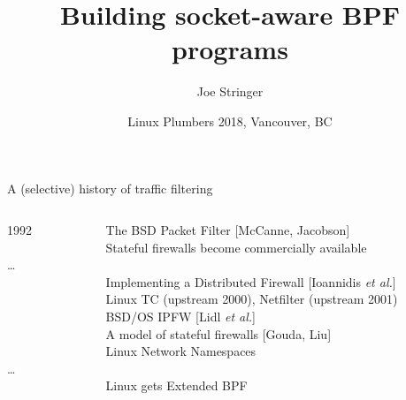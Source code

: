 \documentclass[black,white]{beamer}
\title[BPF Socket Lookup]{Building socket-aware BPF programs}
\institute{Cilium.io}
\author[Joe Stringer]{Joe Stringer}
\date[Nov 13, 2018]{Linux Plumbers 2018, Vancouver, BC}
\begin{document}
    \begin{frame}
    \titlepage
    \end{frame}

    \begin{frame}{A (selective) history of traffic filtering}
        \begin{columns}[c]
            \begin{column}{0.15\textwidth}
                1992\\ \\ \smallskip
                \ldots\\ \\ \smallskip
                ~\\ \\ \\ \\ \smallskip
                \ldots\\ \\ \smallskip
            \end{column}
            \hspace{-50pt}
            \vrule{}
            \begin{column}{0.85\textwidth}
                The BSD Packet Filter [McCanne, Jacobson]\\ \smallskip
                Stateful firewalls become commercially available\\ \smallskip
                ~\\ \smallskip
                Implementing a Distributed Firewall [Ioannidis {\em et al.}]\\ \smallskip
                Linux TC (upstream 2000), Netfilter (upstream 2001)\\ \smallskip
                BSD/OS IPFW [Lidl {\em et al.}]\\ \smallskip
                A model of stateful firewalls [Gouda, Liu]\\ \smallskip
                Linux Network Namespaces\\ \smallskip
                ~\\ \smallskip
                Linux gets Extended BPF\\ \smallskip
            \end{column}
        \end{columns}
    \end{frame}
\end{document}
